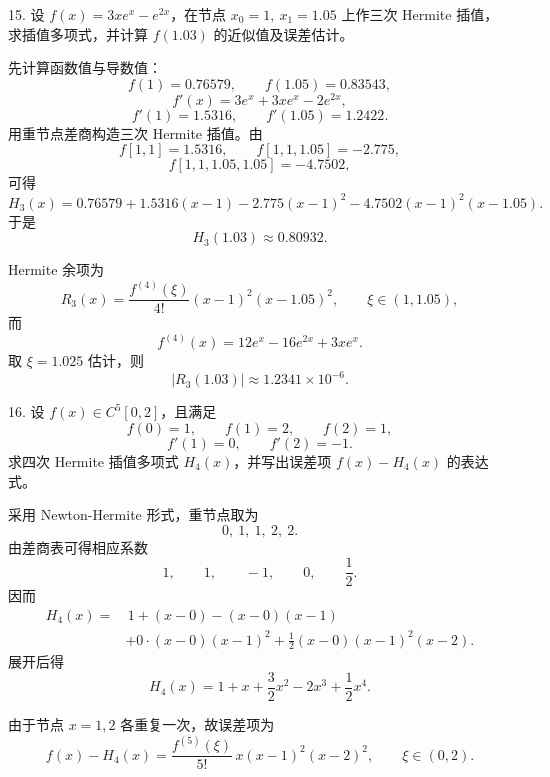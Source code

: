 \documentclass[11pt, a4paper]{ctexart}
\begin{document}
\begin{problem}{15. 设 $f(x)=3xe^x-e^{2x}$，在节点 $x_0=1,\ x_1=1.05$ 上作三次 Hermite 插值，求插值多项式，并计算 $f(1.03)$ 的近似值及误差估计。}
\end{problem}

\begin{solution}
    先计算函数值与导数值：
    \[
        f(1)=0.76579,\qquad f(1.05)=0.83543,
    \]
    \[
        f'(x)=3e^x+3xe^x-2e^{2x},
    \]
    \[
        f'(1)=1.5316,\qquad f'(1.05)=1.2422.
    \]
    用重节点差商构造三次 Hermite 插值。由
    \[
        f[1,1]=1.5316,\qquad f[1,1,1.05]=-2.775,
    \]
    \[
        f[1,1,1.05,1.05]=-4.7502,
    \]
    可得
    \[
        H_3(x)=0.76579+1.5316(x-1)-2.775(x-1)^2-4.7502(x-1)^2(x-1.05).
    \]
    于是
    \[
        H_3(1.03)\approx 0.80932.
    \]

    Hermite 余项为
    \[
        R_3(x)=\frac{f^{(4)}(\xi)}{4!}(x-1)^2(x-1.05)^2,\qquad \xi\in(1,1.05),
    \]
    而
    \[
        f^{(4)}(x)=12e^x-16e^{2x}+3xe^x.
    \]
    取 $\xi=1.025$ 估计，则
    \[
        |R_3(1.03)|\approx 1.2341\times 10^{-6}.
    \]
\end{solution}


\begin{problem}{16. 设 $f(x)\in C^5[0,2]$，且满足}
    \[
        f(0)=1,\qquad f(1)=2,\qquad f(2)=1,
    \]
    \[
        f'(1)=0,\qquad f'(2)=-1.
    \]
    求四次 Hermite 插值多项式 $H_4(x)$，并写出误差项 $f(x)-H_4(x)$ 的表达式。
\end{problem}

\begin{solution}
    采用 Newton-Hermite 形式，重节点取为
    \[
        0,\ 1,\ 1,\ 2,\ 2.
    \]
    由差商表可得相应系数
    \[
        1,\qquad 1,\qquad -1,\qquad 0,\qquad \frac12.
    \]
    因而
    \[
        \begin{aligned}
            H_4(x)=&\,1+(x-0)-(x-0)(x-1) \\
            &+0\cdot (x-0)(x-1)^2
            +\frac12(x-0)(x-1)^2(x-2).
        \end{aligned}
    \]
    展开后得
    \[
        H_4(x)=1+x+\frac32x^2-2x^3+\frac12x^4.
    \]

    由于节点 $x=1,2$ 各重复一次，故误差项为
    \[
        f(x)-H_4(x)=\frac{f^{(5)}(\xi)}{5!}\,x(x-1)^2(x-2)^2,
        \qquad \xi\in(0,2).
    \]
\end{solution}
\end{document}
